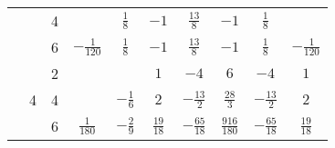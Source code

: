 \begin{table}[H]
\begin{tabular}{|c|c|c|c|c|c|c|c|c|c|}
                                                          &                              & 4                           &                  & $\frac{1}{8}$    & $-1$            & $\frac{13}{8}$   & $-1$              & $\frac{1}{8}$      &                  \\ \cline{3-10}
                                                          &                              & 6                           & $-\frac{1}{120}$ & $\frac{1}{8}$    & $-1$            & $\frac{13}{8}$   & $-1$              & $\frac{1}{8}$      & $-\frac{1}{120}$ \\ \cline{2-10}
                                                          & \multirow{3}{*}{4}           & 2                           &                  &                  & $1$             & $-4$             & $6$               & $-4$               & $1$              \\ \cline{3-10}
                                                          &                              & 4                           &                  & $-\frac{1}{6}$   & $2$             & $-\frac{13}{2}$  & $\frac{28}{3}$    & $-\frac{13}{2}$    & $2$              \\ \cline{3-10}
                                                          &                              & 6                           & $\frac{1}{180}$  & $-\frac{2}{9}$   & $\frac{19}{18}$ & $-\frac{65}{18}$ & $\frac{916}{180}$ & $-\frac{65}{18}$   & $\frac{19}{18}$  \\ \hline


\end{tabular}
\end{table}
